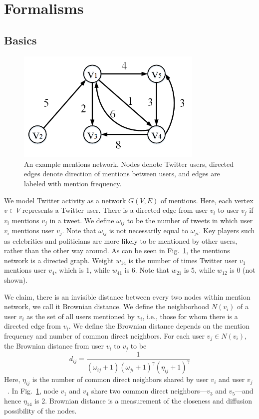 
\section{Formalisms}

\subsection{Basics}
\begin{figure}[th]
\centering
\includegraphics[width=3.5in]{figures/mention_network.png} %
\caption{An example mentions network. Nodes denote Twitter users,
directed edges denote direction of mentions between users, and edges
are labeled with mention frequency.}
\label{fig:mention_network}
\end{figure}

We model Twitter activity as a network $G(V,E)$ of mentions.
Here, each vertex $v \in V$ represents a Twitter user.
There is a directed edge from user $v_i$ to user $v_j$
if $v_i$ mentions $v_j$ in
a tweet.
We define $\omega_{ij}$ to be the number of tweets in which user $v_i$ mentions user $v_j$. Note that $\omega_{ij}$ is not necessarily equal to $\omega_{ji}$.
Key players such as celebrities and politicians are more
likely to be mentioned by other users, rather than the other way around.
As can be seen in Fig.~\ref{fig:mention_network}, the mentions network
is a directed graph. Weight $w_{14}$ is the number of times Twitter user $v_1$ mentions user $v_4$, which is 1, while $w_{41}$ is 6. Note
that $w_{21}$ is 5, while $w_{12}$ is 0 (not shown).

We claim, there is an invisible distance between every two nodes within mention network, we call it Brownian distance.
We define the neighborhood $N(v_i)$ of a user $v_i$ as the set of all users
mentioned by $v_i$, i.e., those for whom there is a directed edge from $v_i$. We define the Brownian distance depends on the mention frequency and number of common direct neighbors. For each user $v_j \in N(v_i)$, the Brownian distance from user $v_i$ to $v_j$ to be
\begin{equation}
 d_{ij}=\frac{1}{(\omega_{ij}+1)(\omega_{ji}+1)^\gamma(\eta_{ij}+1)^\gamma}
\end{equation}
Here, $\eta_{ij}$ is the number of common direct neighbors shared by user $v_i$ and user $v_j$~\cite{zhou2004network}. In Fig.~\ref{fig:mention_network}, node $v_1$ and $v_4$ share two common direct neighbors---$v_3$ and $v_5$---and hence $\eta_{14}$ is 2. Brownian distance is a measurement of the closeness and diffusion possibility of the nodes.


